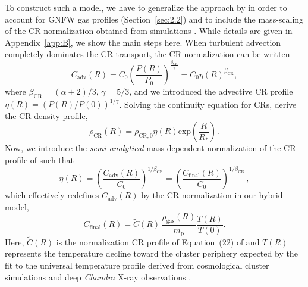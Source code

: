 \documentclass[traditabstract]{aa}
\newcommand{\rmn}{\mathrm}
\begin{document}
To construct such a model, we have to generalize the approach by
\citet{2011A&A...527A..99E} in order to account for GNFW gas profiles
(Section~\ref{sec:2.2}) and to include the mass-scaling of the CR normalization
obtained from simulations \citep{2010MNRAS.409..449P}. While details are given
in Appendix~\ref{app:B}, we show the main steps here. When turbulent advection
completely dominates the CR transport, the CR normalization can be written
\citep{2011A&A...527A..99E}
\begin{equation}
C_{\rmn{adv}}(R)=C_{0} \left( \frac{P(R)}{P_{0}} \right)^{\frac{\beta_{\rmn{CR}}}{\gamma}} = 
C_{0} \eta(R)^{\beta_{\rmn{CR}}},
\label{eq:Csimple_1}
\end{equation} 
where $\beta_{\rmn{CR}}=(\alpha+2)/3$, $\gamma=5/3$, and we introduced the
advective CR profile $\eta(R)=(P(R)/P(0))^{1/\gamma}$. Solving the continuity
equation for CRs, \citet{2011A&A...527A..99E} derive the CR density profile,
\begin{equation}
\rho_{\rmn{CR}}(R) = \rho_{\rmn{CR},0} \eta(R) \rmn{exp} \left( \frac{R}{R_{*}} \right) \, .
\label{eg:rhoCR_1}
\end{equation} 
Now, we introduce the \emph{semi-analytical} mass-dependent normalization of the
CR profile of \cite{2010MNRAS.409..449P} such that
\begin{equation}
\eta(R) = \left( \frac{C_{\rmn{adv}}(R)}{C_0} \right)^{1/\beta_{\rmn{CR}}} = 
\left( \frac{C_{\rmn{final}}(R)}{C_0} \right)^{1/\beta_{\rmn{CR}}} \, ,
\label{eq:eta}
\end{equation} 
which effectively redefines $C_{\rmn{adv}}(R)$ by the CR normalization in our hybrid model,
\begin{equation}
C_{\rmn{final}}(R) =  \tilde{C}(R)\, \frac{\rho_{\rmn{gas}}(R)}{m_\rmn{p}} \frac{T(R)}{T(0)}.
\label{eq:Cf}
\end{equation} 
Here, $\tilde{C}(R)$ is the normalization CR profile of Equation~(22) of
\cite{2010MNRAS.409..449P} and $T(R)$ represents the temperature decline toward
the cluster periphery expected by the fit to the universal temperature profile
derived from cosmological cluster simulations
\citep{2007MNRAS.378..385P,2010MNRAS.409..449P} and deep {\em Chandra} X-ray
observations \citep{2005ApJ...628..655V}.
\end{document}
